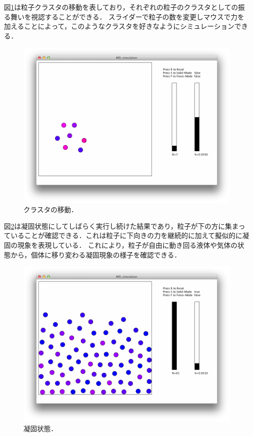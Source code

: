 図\ref{fig:cluster}は粒子クラスタの移動を表しており，それぞれの粒子のクラスタとしての振る舞いを視認することができる．
スライダーで粒子の数を変更しマウスで力を加えることによって，このようなクラスタを好きなようにシミュレーションできる．
\begin{figure}[htbp]
 \begin{center}
  \includegraphics[width=150mm]{../result/cluster_picture.png}
 \end{center}
 \caption{クラスタの移動．}
 \label{fig:cluster}
\end{figure}


\newpage

図\ref{fig:solid}は凝固状態にしてしばらく実行し続けた結果であり，粒子が下の方に集まっていることが確認できる．これは粒子に下向きの力を継続的に加えて擬似的に凝固の現象を表現している．
これにより，粒子が自由に動き回る液体や気体の状態から，個体に移り変わる凝固現象の様子を確認できる．


\begin{figure}[htbp]
 \begin{center}
  \includegraphics[width=150mm]{../implement/solid_mode.png}
 \end{center}
 \caption{凝固状態．}
 \label{fig:solid}
\end{figure}

